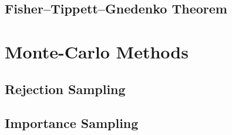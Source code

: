 \documentclass[11pt]{report} %
\begin{document}
\subsection{Fisher–Tippett–Gnedenko Theorem \cite{David2005}}


\section{Monte-Carlo Methods}

\subsection{Rejection Sampling}

\subsection{Importance Sampling}
\end{document}
